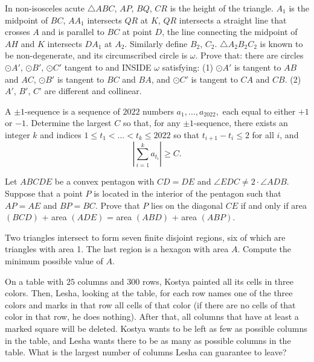 \documentclass[11pt]{scrartcl}
\begin{document}
\begin{problem}[1293772592063302344]
In non-isosceles acute ${}{\triangle ABC}$, $AP$, $BQ$, $CR$ is the height of the triangle. $A_1$ is the midpoint of $BC$, $AA_1$ intersects $QR$ at $K$, $QR$ intersects a straight line that crosses ${A}$ and is parallel to $BC$ at point ${D}$, the line connecting the midpoint of $AH$ and ${K}$ intersects $DA_1$ at $A_2$. Similarly define $B_2$, $C_2$. ${}\triangle A_2B_2C_2$ is known to be non-degenerate, and its circumscribed circle is $\omega$. Prove that: there are circles $\odot A'$, $\odot B'$, $\odot C'$ tangent to and INSIDE $\omega$ satisfying:
(1) $\odot A'$ is tangent to $AB$ and $AC$, $\odot B'$ is tangent to $BC$ and $BA$, and $\odot C'$ is tangent to $CA$ and $CB$.
(2) $A'$, $B'$, $C$' are different and collinear.
\end{problem}
\begin{problem}[7948249970111159954]
	A $\pm 1$-sequence is a sequence of $2022$ numbers $a_1, \ldots, a_{2022},$ each equal to either $+1$ or $-1$. Determine the largest $C$ so that, for any $\pm 1$-sequence, there exists an integer $k$ and indices $1 \le t_1 < \ldots < t_k \le 2022$ so that $t_{i+1} - t_i \le 2$ for all $i$, and$$\left| \sum_{i = 1}^{k} a_{t_i} \right| \ge C.$$
\end{problem}
\begin{problem}[1336030836839904136]
Let $ABCDE$ be a convex pentagon with $CD= DE$ and $\angle EDC \ne 2 \cdot \angle ADB$.
Suppose that a point $P$ is located in the interior of the pentagon such that $AP =AE$ and $BP= BC$.
Prove that $P$ lies on the diagonal $CE$ if and only if area $(BCD)$ + area $(ADE)$ = area $(ABD)$ + area $(ABP)$.
\end{problem}
\begin{problem}[1580707630770476037]
Two triangles intersect to form seven finite disjoint regions, six of which are triangles with area 1. The last region is a hexagon with area \(A\). Compute the minimum possible value of \(A\).
\end{problem}
\begin{problem}[482459214391384]
	On a table with $25$ columns and $300$ rows, Kostya painted all its cells in three colors. Then, Lesha, looking at the table, for each row names one of the three colors and marks in that row all cells of that color (if there are no cells of that color in that row, he does nothing). After that, all columns that have at least a marked square will be deleted.
Kostya wants to be left as few as possible columns in the table, and Lesha wants there to be as many as possible columns in the table. What is the largest number of columns Lesha can guarantee to leave?
\end{problem}
\end{document}
